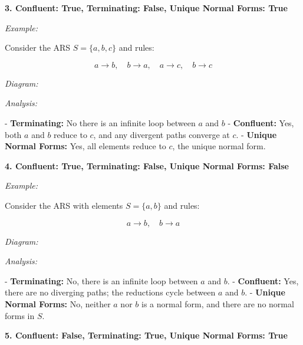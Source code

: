 \documentclass{article}
\theoremstyle{theorem}
\theoremstyle{definition}
\theoremstyle{remark}
\begin{document}
\textbf{3. Confluent: True, Terminating: False, Unique Normal Forms: True}

\textit{Example:}

Consider the ARS \( S = \{ a, b, c \} \) and rules:

\[
  a \to b, \quad b \to a, \quad a \to c, \quad b \to c
\]

\textit{Diagram:}

\begin{center}
\end{center}

\textit{Analysis:}

- \textbf{Terminating:} No there is an infinite loop between \( a \) and \( b \)
- \textbf{Confluent:} Yes, both \( a \) and \( b \) reduce to \( c \), and any divergent paths converge at \( c \).
- \textbf{Unique Normal Forms:} Yes, all elements reduce to \( c \), the unique normal form.


\textbf{4. Confluent: True, Terminating: False, Unique Normal Forms: False}

\textit{Example:}

Consider the ARS with elements \( S = \{ a, b \} \) and rules:

\[
  a \to b, \quad b \to a
\]

\textit{Diagram:}

\begin{center}
\end{center}

\textit{Analysis:}

- \textbf{Terminating:} No, there is an infinite loop between \( a \) and \( b \).
- \textbf{Confluent:} Yes, there are no diverging paths; the reductions cycle between \( a \) and \( b \).
- \textbf{Unique Normal Forms:} No, neither \( a \) nor \( b \) is a normal form, and there are no normal forms in \( S \).


\textbf{5. Confluent: False, Terminating: True, Unique Normal Forms: True}
\end{document}
